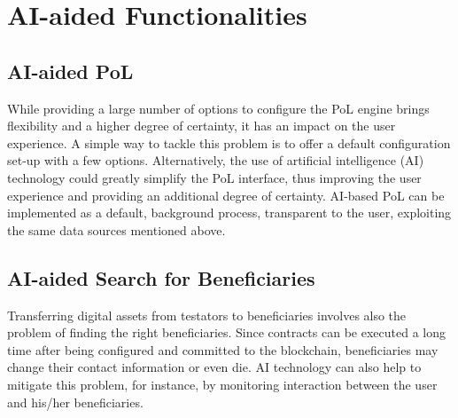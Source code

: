 \section{AI-aided Functionalities} %
\label{sec:ai_aided_functionalities}


\subsection*{AI-aided PoL} %
\label{sub:ai_based_pol}

While providing a large number of options to configure the PoL engine brings flexibility and a higher degree of certainty, it has an impact on the user experience. A simple way to tackle this problem is to offer a default configuration set-up with a few options. Alternatively, the use of artificial intelligence (AI) technology could greatly simplify the PoL interface, thus improving the user experience and providing an additional degree of certainty. AI-based PoL can be implemented as a default, background process, transparent to the user, exploiting the same data sources mentioned above.


\subsection*{AI-aided Search for Beneficiaries} %
\label{sub:ai_aided_search_for_beneficiaries}
Transferring digital assets from testators to beneficiaries involves also the problem of finding the right beneficiaries. Since contracts can be executed a long time after being configured and committed to the blockchain, beneficiaries may change their contact information or even die. 
AI technology can also help to mitigate this problem, for instance, by monitoring interaction between the user and his/her beneficiaries.


